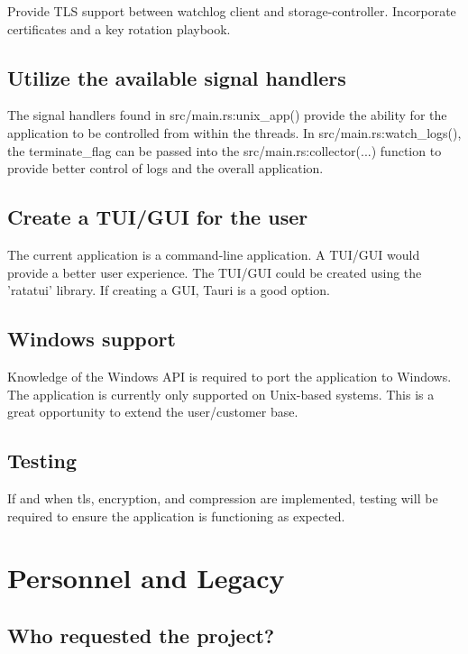 \documentclass{article}
\begin{document}
Provide TLS support between watchlog client and storage-controller. Incorporate certificates and a key rotation playbook.

\subsection{Utilize the available signal handlers}

The signal handlers found in src/main.rs:unix\_app() provide the ability for the application to be controlled from within the threads. In src/main.rs:watch\_logs(), the terminate\_flag can be passed into the src/main.rs:collector(...) function to provide better control of logs and the overall application.

\subsection{Create a TUI/GUI for the user}

The current application is a command-line application. A TUI/GUI would provide a better user experience. The TUI/GUI could be created using the 'ratatui' library. If creating a GUI, Tauri is a good option.\vspace{0.25cm}


\subsection{Windows support}

Knowledge of the Windows API is required to port the application to Windows. The application is currently only supported on Unix-based systems. This is a great opportunity to extend the user/customer base.

\subsection{Testing}

If and when tls, encryption, and compression are implemented, testing will be required to ensure the application is functioning as expected. 

\newpage

\section{Personnel and Legacy}

\subsection{Who requested the project?}
\end{document}
